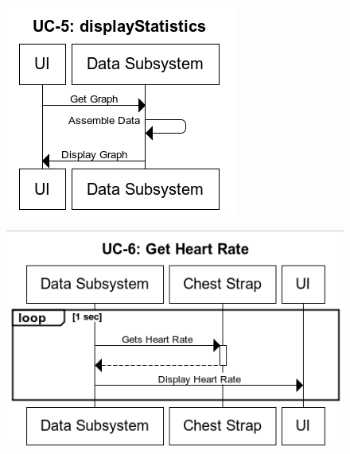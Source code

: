 \documentclass[letterpaper,english, 12pt]{scrreprt}
\begin{document}
\begin{figure}[H]
        \centering
        \includegraphics[width=\textwidth]{img/ssd/ssd_uc5.png}\\
\end{figure}
\begin{figure}[H]
	    \centering
        \includegraphics[width=\textwidth]{img/ssd/ssd_uc6.png}\\
\end{figure}
\end{document}
